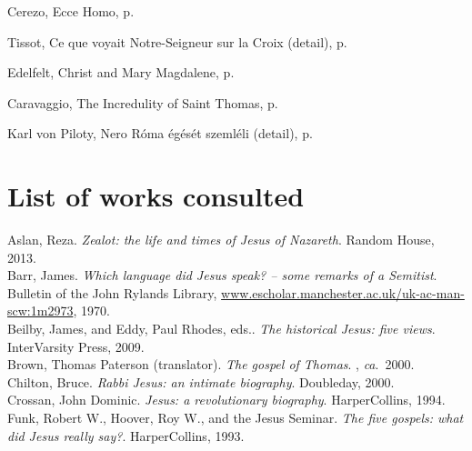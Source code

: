 \documentclass[10pt,a5paper,twoside]{article}
\newcommand{\artcredit}[3]{#2, #3, p.~\pageref{fig:#1}}
\begin{document}
\artcredit{ecce-homo}{Cerezo}{Ecce Homo}

\artcredit{what-our-lord-saw-from-the-cross-detail}{Tissot}{Ce que voyait Notre-Seigneur sur la Croix (detail)}

\artcredit{resurrection-mary-magdalene}{Edelfelt}{Christ and Mary Magdalene}

\artcredit{doubting-thomas}{Caravaggio}{The Incredulity of Saint Thomas}

\artcredit{nero}{Karl von Piloty}{Nero Róma égését szemléli (detail)}

\vfill\pagebreak\section*{List of works consulted}

\newcommand{\refbook}[4]{#1. \emph{#2}. #3, #4.\\} %

\refbook{Aslan, Reza}{Zealot: the life and times of Jesus of Nazareth}{Random House}{2013}

\refbook{Barr, James}{Which language did Jesus speak? -- some remarks of a Semitist}{Bulletin of the John Rylands Library,
\url{www.escholar.manchester.ac.uk/uk-ac-man-scw:1m2973}}{1970}

\refbook{Beilby, James, and Eddy, Paul Rhodes, eds.}{The historical Jesus: five views}{InterVarsity Press}{2009}

\refbook{Brown, Thomas Paterson (translator)}{The gospel of Thomas}{}{\emph{ca}.~2000}

\refbook{Chilton, Bruce}{Rabbi Jesus: an intimate biography}{Doubleday}{2000}


\refbook{Crossan, John Dominic}{Jesus: a revolutionary biography}{HarperCollins}{1994}

\refbook{Funk, Robert W., Hoover, Roy W., and the Jesus Seminar}{The five gospels: what did Jesus really say?}{HarperCollins}{1993}
\end{document}
